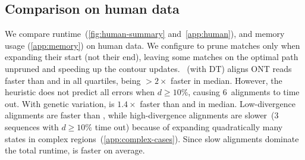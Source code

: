 \subsection{Comparison on human data} \label{GLOBALsec:evals-comparison-hg}

We compare runtime~(\cref{fig:human-summary} and~\cref{app:human}), and memory
usage (\cref{app:memory}) on human data.
%
We configure \astarpa to prune matches only when expanding their start (not
their end), leaving some matches on the optimal path unpruned and speeding up
the contour updates.
%
\astarpa~(\GCH with DT) aligns ONT reads faster than \edlib and \wfa in all
quartiles, being ${>}2\times$ faster in median. However, the heuristic does not predict all errors
when $d{\geq}10\%$, causing $6$~alignments to time out.
%
With genetic variation, \astarpa is $1.4\times$ faster than \edlib and \wfa in
median. Low-divergence alignments are faster than \edlib, while
high-divergence alignments are slower~($3$ sequences with $d{\geq}10\%$ time out) because of expanding
quadratically many states in complex regions~(\cref{app:complex-cases}). Since slow alignments
dominate the total runtime, \edlib is faster on average.
